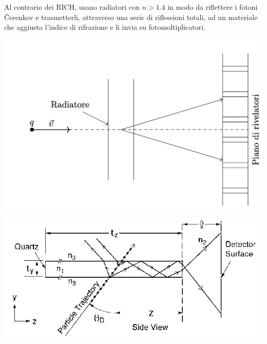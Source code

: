 \documentclass[10pt, a4paper]{scrartcl}
\numberwithin{equation}{subsection}
\theoremstyle{style1}
\begin{document}
\begin{itemize}
		Al contrario dei RICH, usano radiatori con $n>1.4$ in modo da riflettere i fotoni \v Cerenkov e trasmetterli, attraverso una serie di riflessioni totali, ad un materiale che aggiusta l'indice di rifrazione e li invia su fotomoltiplicatori.
		\begin{center}
		\begin{minipage}{.4\columnwidth}
			\centering
			\includegraphics[width=\columnwidth]{rc-rich.png}
		\end{minipage}
		\hfill
		\begin{minipage}{.4\columnwidth}
			\centering
			\includegraphics[width=\columnwidth]{dirc.png}
		\end{minipage}
		\end{center}
\end{itemize}
\end{document}

